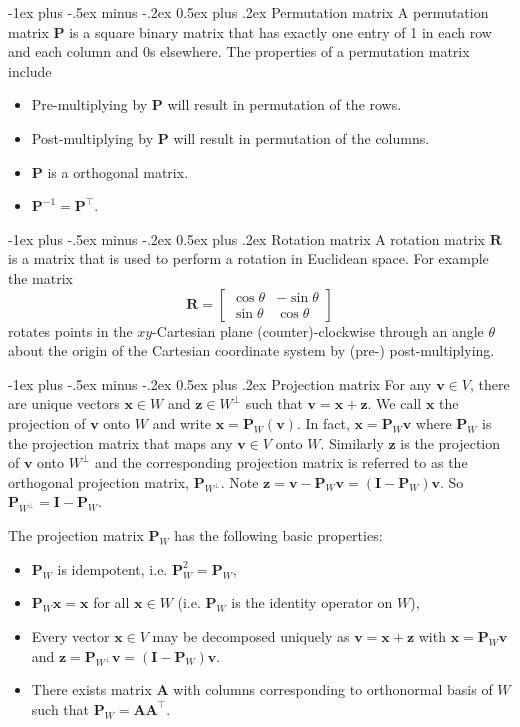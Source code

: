 \documentclass[12pt,landscape, a4paper]{article}
\makeatletter
\newcommand{\bs}[1]{\ensuremath{\boldsymbol{#1}}}
\newcommand{\tp}{{\!\scriptscriptstyle \top}}
\renewcommand{\section}{\@startsection{section}{1}{0mm}%
                                {-1ex plus -.5ex minus -.2ex}%
                                {0.5ex plus .2ex}%
                                {\normalfont\large\bfseries}}
\makeatother
\begin{document}
\begin{multicols}{3}
\section{Permutation matrix}
A permutation matrix $\bs{P}$ is a square binary matrix that has exactly one entry of 1 in each row and each column and 0s elsewhere. The properties of a permutation matrix include
\begin{itemize}
	\item Pre-multiplying by $\bs{P}$ will result in permutation of the rows. 
	\item Post-multiplying by $\bs{P}$ will result in permutation of the columns.
	\item \bs{P} is a orthogonal matrix.
	\item $\bs{P}^{-1} = \bs{P}^\tp$.
\end{itemize}

\section{Rotation matrix}
A rotation matrix \bs{R} is a matrix that is used to perform a rotation in Euclidean space. For example the matrix
$$\bs{R} = \begin{bmatrix}
\cos\theta & -\sin\theta\\
\sin\theta & \cos\theta
\end{bmatrix} $$
rotates points in the $xy$-Cartesian plane (counter)-clockwise through an angle $\theta$ about the origin of the Cartesian coordinate system by (pre-) post-multiplying.

\section{Projection matrix}
For any $\bs{v}\in V$, there are unique vectors $\bs{x}\in W$ and $\bs{z}\in W^\perp$ such that $\bs{v} = \bs{x} + \bs{z}$. We call $\bs{x}$ the projection of $\bs{v}$ onto $W$ and write $\bs{x} = \bs{P}_W(\bs{v})$. In fact, $\bs{x} = \bs{P}_W\bs{v}$ where $\bs{P}_W$ is the projection matrix that maps any $\bs{v}\in V$ onto $W$. Similarly $\bs{z}$ is the projection of $\bs{v}$ onto $W^\perp$ and the corresponding projection matrix is referred to as the orthogonal projection matrix, $\bs{P}_{W^\perp}$. Note $\bs{z} = \bs{v} - \bs{P}_W\bs{v}=(\bs{I} - \bs{P}_W)\bs{v}$. So $\bs{P}_{W^\perp} = \bs{I} - \bs{P}_W$. 

The projection matrix $\bs{P}_W$ has the following basic properties:
\begin{itemize}
	\item $\bs{P}_W$ is idempotent, i.e. $\bs{P}_W^2 = \bs{P}_W$,
	\item $\bs{P}_W\bs{x} = \bs{x}$ for all $\bs{x}\in W$ (i.e. $\bs{P}_W$ is the identity operator on $W$),
	\item Every vector $\bs{x}\in V$ may be decomposed uniquely as $\bs{v} = \bs{x} + \bs{z}$ with $\bs{x} = \bs{P}_W\bs{v}$ and $\bs{z} = \bs{P}_{W^\perp}\bs{v} = (\bs{I} - \bs{P}_W)\bs{v}$. 
	\item There exists matrix $\bs{A}$ with columns corresponding to orthonormal basis of $W$ such that $\bs{P}_W = \bs{A}\bs{A}^\tp$.  
\end{itemize}


\end{multicols}
\end{document}
